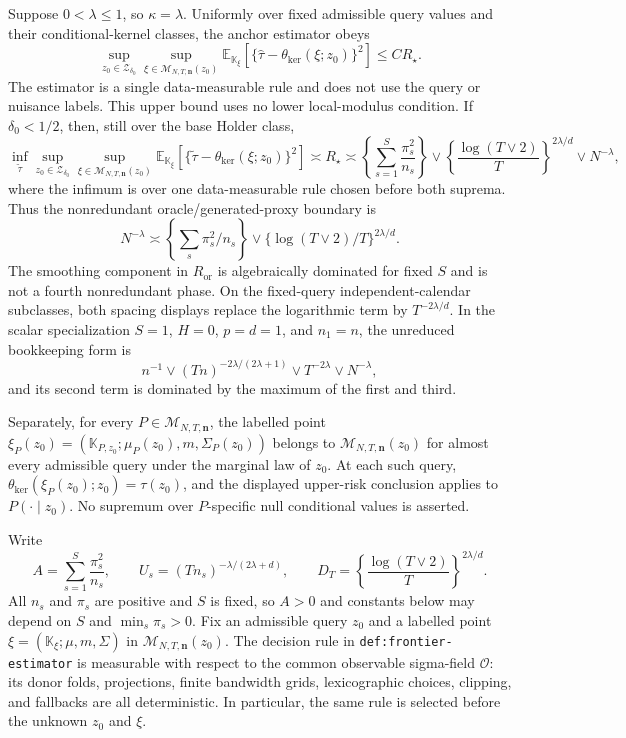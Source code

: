 Suppose \(0<\lambda\le1\), so \(\kappa=\lambda\).  Uniformly over fixed
admissible query values and their conditional-kernel classes, the anchor
estimator obeys
\[
 \sup_{z_0\in\mathcal Z_{\delta_0}}
 \sup_{\xi\in\mathcal M_{N,T,\mathbf n}(z_0)}
 \mathbb E_{\mathbb K_\xi}
 [\{\widehat\tau-\theta_{\mathrm{ker}}(\xi;z_0)\}^2]
 \le CR_\star.
\]
The estimator is a single data-measurable rule and does not use the query or
nuisance labels.  This upper bound uses no lower local-modulus condition.  If
\(\delta_0<1/2\), then, still over the base Holder class,
\[
 \inf_{\widetilde\tau}
 \sup_{z_0\in\mathcal Z_{\delta_0}}
 \sup_{\xi\in\mathcal M_{N,T,\mathbf n}(z_0)}
 \mathbb E_{\mathbb K_\xi}
 [\{\widetilde\tau-\theta_{\mathrm{ker}}(\xi;z_0)\}^2]
 \asymp R_\star
 \asymp
 \left\{\sum_{s=1}^{S}\frac{\pi_s^2}{n_s}\right\}
 \vee\left\{\frac{\log(T\vee2)}{T}\right\}^{2\lambda/d}
 \vee N^{-\lambda},
\]
where the infimum is over one data-measurable rule chosen before both
suprema.  Thus the nonredundant oracle/generated-proxy boundary is
\[
 N^{-\lambda}\asymp
 \left\{\sum_s\pi_s^2/n_s\right\}
 \vee\{\log(T\vee2)/T\}^{2\lambda/d}.
\]
The smoothing component in \(R_{\mathrm{or}}\) is algebraically dominated
for fixed \(S\) and is not a fourth nonredundant phase.  On the fixed-query
independent-calendar subclasses, both spacing displays replace the
logarithmic term by \(T^{-2\lambda/d}\).  In the scalar specialization
\(S=1\), \(H=0\), \(p=d=1\), and \(n_1=n\), the unreduced bookkeeping form is
\[
 n^{-1}\vee(Tn)^{-2\lambda/(2\lambda+1)}
 \vee T^{-2\lambda}\vee N^{-\lambda},
\]
and its second term is dominated by the maximum of the first and third.

Separately, for every \(P\in\mathcal M_{N,T,\mathbf n}\), the labelled point
\(\xi_P(z_0)=(\mathbb K_{P,z_0};\mu_P(z_0),m,\Sigma_P(z_0))\) belongs to
\(\mathcal M_{N,T,\mathbf n}(z_0)\) for almost every admissible query under
the marginal law of \(z_0\).  At each such query,
\(\theta_{\mathrm{ker}}(\xi_P(z_0);z_0)=\tau(z_0)\), and the displayed
upper-risk conclusion applies to \(P(\cdot\mid z_0)\).  No supremum over
\(P\)-specific null conditional values is asserted.

Write
\[
 A=\sum_{s=1}^{S}\frac{\pi_s^2}{n_s},\qquad
 U_s=(Tn_s)^{-\lambda/(2\lambda+d)},\qquad
 D_T=\left\{\frac{\log(T\vee2)}{T}\right\}^{2\lambda/d}.       \tag{1}
\]
All \(n_s\) and \(\pi_s\) are positive and \(S\) is fixed, so \(A>0\)
and constants below may depend on \(S\) and
\(\min_s\pi_s>0\).  Fix an admissible query \(z_0\) and a labelled point
\(\xi=(\mathbb K_\xi;\mu,m,\Sigma)\) in
\(\mathcal M_{N,T,\mathbf n}(z_0)\).  The decision rule in
\texttt{def:frontier-estimator} is measurable with respect to the common
observable sigma-field \(\mathcal O\): its donor folds, projections, finite
bandwidth grids, lexicographic choices, clipping, and fallbacks are all
deterministic.  In particular, the same rule is selected before the unknown
\(z_0\) and \(\xi\).

